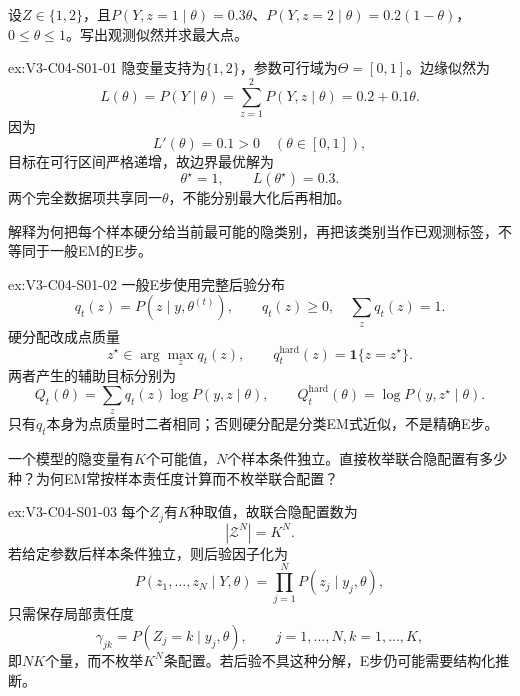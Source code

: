 \begin{SLChapterExercisePairSection}

\begin{exercise}\label{ex:V3-C04-S01-01}
设$Z\in\{1,2\}$，且$P(Y,z=1\mid\theta)=0.3\theta$、$P(Y,z=2\mid\theta)=0.2(1-\theta)$，$0\leq\theta\leq1$。写出观测似然并求最大点。
\end{exercise}
\ifSLFullEdition
{}\label{sol:V3-C04-S01-01}
\begin{chapterexercisesolution}{ex:V3-C04-S01-01}
隐变量支持为$\{1,2\}$，参数可行域为$\Theta=[0,1]$。边缘似然为
\[
L(\theta)=P(Y\mid\theta)
=\sum_{z=1}^{2}P(Y,z\mid\theta)
=0.2+0.1\theta.
\]
因为
\[
L'(\theta)=0.1>0\quad(\theta\in[0,1]),
\]
目标在可行区间严格递增，故边界最优解为
\[
\theta^\star=1,
\qquad
L(\theta^\star)=0.3.
\]
两个完全数据项共享同一$\theta$，不能分别最大化后再相加。
\end{chapterexercisesolution}
\fi

\begin{exercise}\label{ex:V3-C04-S01-02}
解释为何把每个样本硬分给当前最可能的隐类别，再把该类别当作已观测标签，不等同于一般EM的E步。
\end{exercise}
\ifSLFullEdition
{}\label{sol:V3-C04-S01-02}
\begin{chapterexercisesolution}{ex:V3-C04-S01-02}
一般E步使用完整后验分布
\[
q_t(z)=P(z\mid y,\theta^{(t)}),
\qquad q_t(z)\geq0,\quad \sum_zq_t(z)=1.
\]
硬分配改成点质量
\[
z^\star\in\arg\max_zq_t(z),
\qquad
q_t^{\mathrm{hard}}(z)=\mathbf1\{z=z^\star\}.
\]
两者产生的辅助目标分别为
\[
Q_t(\theta)=\sum_zq_t(z)\log P(y,z\mid\theta),
\qquad
Q_t^{\mathrm{hard}}(\theta)=\log P(y,z^\star\mid\theta).
\]
只有$q_t$本身为点质量时二者相同；否则硬分配是分类EM式近似，不是精确E步。
\end{chapterexercisesolution}
\fi

\begin{exercise}\label{ex:V3-C04-S01-03}
一个模型的隐变量有$K$个可能值，$N$个样本条件独立。直接枚举联合隐配置有多少种？为何EM常按样本责任度计算而不枚举联合配置？
\end{exercise}
\ifSLFullEdition
{}\label{sol:V3-C04-S01-03}
\begin{chapterexercisesolution}{ex:V3-C04-S01-03}
每个$Z_j$有$K$种取值，故联合隐配置数为
\[
|\mathcal Z^N|=K^N.
\]
若给定参数后样本条件独立，则后验因子化为
\[
P(z_1,\ldots,z_N\mid Y,\theta)
=\prod_{j=1}^{N}P(z_j\mid y_j,\theta),
\]
只需保存局部责任度
\[
\gamma_{jk}=P(Z_j=k\mid y_j,\theta),
\qquad j=1,\ldots,N, k=1,\ldots,K,
\]
即$NK$个量，而不枚举$K^N$条配置。若后验不具这种分解，E步仍可能需要结构化推断。
\end{chapterexercisesolution}
\fi


\end{SLChapterExercisePairSection}
